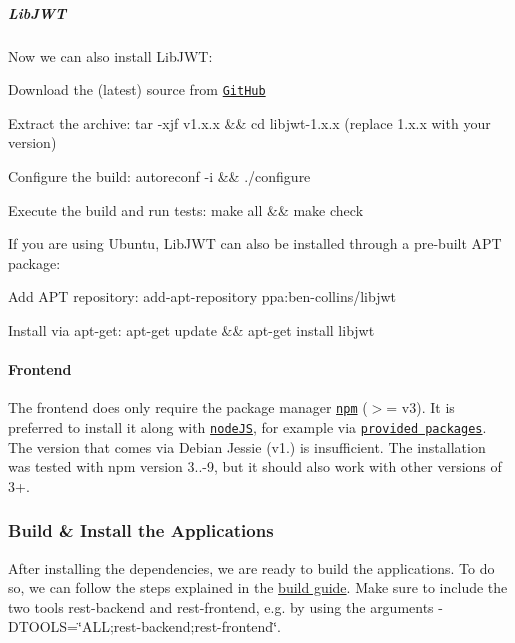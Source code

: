 \subparagraph*{Lib\+J\+WT}

Now we can also install Lib\+J\+WT\+:


\begin{DoxyItemize}
\item Download the (latest) source from \href{https://github.com/benmcollins/libjwt/releases}{\tt Git\+Hub}
\item Extract the archive\+: {\ttfamily tar -\/xjf v1.\+x.\+x \&\& cd libjwt-\/1.\+x.\+x} (replace 1.\+x.\+x with your version)
\item Configure the build\+: {\ttfamily autoreconf -\/i \&\& ./configure}
\item Execute the build and run tests\+: {\ttfamily make all \&\& make check}
\end{DoxyItemize}

If you are using Ubuntu, Lib\+J\+WT can also be installed through a pre-\/built A\+PT package\+:


\begin{DoxyItemize}
\item Add A\+PT repository\+: {\ttfamily add-\/apt-\/repository ppa\+:ben-\/collins/libjwt}
\item Install via apt-\/get\+: {\ttfamily apt-\/get update \&\& apt-\/get install libjwt}
\end{DoxyItemize}

\paragraph*{Frontend}

The frontend does only require the package manager \href{https://www.npmjs.com/}{\tt npm} ($>$= v3). It is preferred to install it along with \href{https://nodejs.org/}{\tt node\+JS}, for example via \href{https://nodejs.org/en/download/package-manager/}{\tt provided packages}. The version that comes via Debian Jessie (v1.) is insufficient. The installation was tested with npm version 3..-\/9, but it should also work with other versions of 3+.

\subsubsection*{Build \& Install the Applications}

After installing the dependencies, we are ready to build the applications. To do so, we can follow the steps explained in the \hyperlink{doc_COMPILE_md}{build guide}. Make sure to include the two tools {\ttfamily rest-\/backend} and {\ttfamily rest-\/frontend}, e.\+g. by using the arguments {\ttfamily -\/\+D\+T\+O\+O\+LS=\char`\"{}\+A\+L\+L;rest-\/backend;rest-\/frontend\char`\"{}}.

